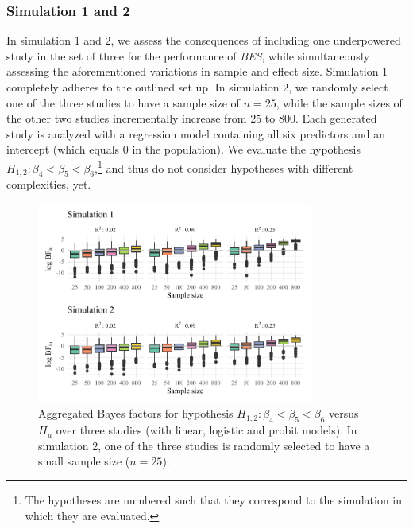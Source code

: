 \documentclass[
  authoryear,
  preprint,
  5p,
  twocolumn]{elsarticle}
\begin{document}
\hypertarget{simulation-1-and-2}{%
\subsubsection{Simulation 1 and 2}\label{simulation-1-and-2}}

In simulation 1 and 2, we assess the consequences of including one
underpowered study in the set of three for the performance of
\emph{BES}, while simultaneously assessing the aforementioned variations
in sample and effect size. Simulation 1 completely adheres to the
outlined set up. In simulation 2, we randomly select one of the three
studies to have a sample size of \(n = 25\), while the sample sizes of
the other two studies incrementally increase from \(25\) to \(800\).
Each generated study is analyzed with a regression model containing all
six predictors and an intercept (which equals 0 in the population). We
evaluate the hypothesis
\(H_{1,2}: \beta_4 < \beta_5 < \beta_6\),\footnote{ The hypotheses are
  numbered such that they correspond to the simulation in which they are
  evaluated.} and thus do not consider hypotheses with different
complexities, yet.

\begin{figure}

{\centering \includegraphics[width=0.81\textwidth,height=\textheight]{manuscript_volker_files/figure-pdf/fig-sim12-1.pdf}

}

\caption{\label{fig-sim12-1}Aggregated Bayes factors for hypothesis
\(H_{1,2}: \beta_4 < \beta_5 < \beta_6\) versus \(H_u\) over three
studies (with linear, logistic and probit models). In simulation 2, one
of the three studies is randomly selected to have a small sample size
(\(n = 25\)).}

\end{figure}
\end{document}
